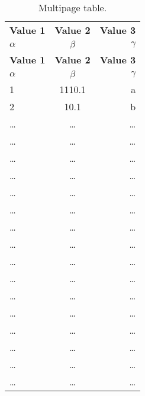 \begin{longtable}[c]{l|S|r}                                  %
    \caption{Multipage table.}
    \label{tab:table1}\\                                        %
    \toprule
    \textbf{Value 1} & \textbf{Value 2} & \textbf{Value 3}\\
    $\alpha$ & $\beta$ & $\gamma$ \\
    \midrule
    \endfirsthead                                               %
    \toprule
    \textbf{Value 1} & \textbf{Value 2} & \textbf{Value 3}\\
    $\alpha$ & $\beta$ & $\gamma$ \\
    \midrule
    \endhead                                                    %
    1 & 1110.1 & a\\
    2 & 10.1 & b\\
    \ldots & \ldots & \ldots \\                                 %
    \ldots & \ldots & \ldots \\
    \ldots & \ldots & \ldots \\
    \ldots & \ldots & \ldots \\
    \ldots & \ldots & \ldots \\
    \ldots & \ldots & \ldots \\
    \ldots & \ldots & \ldots \\
    \ldots & \ldots & \ldots \\
    \ldots & \ldots & \ldots \\
    \ldots & \ldots & \ldots \\
    \ldots & \ldots & \ldots \\
    \ldots & \ldots & \ldots \\
    \ldots & \ldots & \ldots \\
    \ldots & \ldots & \ldots \\
    \ldots & \ldots & \ldots \\
    \ldots & \ldots & \ldots \\

\end{longtable}
